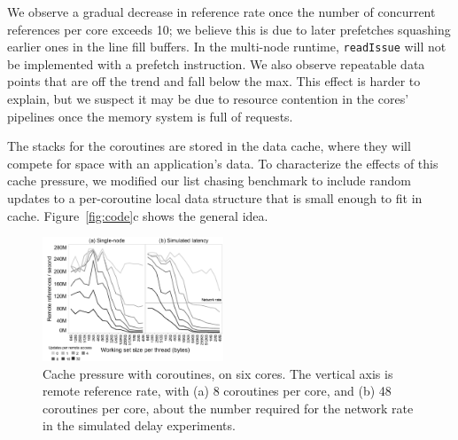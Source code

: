 \documentclass[10pt,nocopyrightspace]{sigplanconf}
\begin{document}
We observe a gradual decrease in reference rate once the number of
concurrent references per core exceeds 10; we believe this is due to
later prefetches squashing earlier ones in the line fill buffers. In
the multi-node runtime, \texttt{readIssue} will not be implemented
with a prefetch instruction. 
We also observe repeatable data points that are off the trend and fall below the max. This effect is harder to explain, but we suspect it may be
due to resource contention in the cores' pipelines once the memory
system is full of requests. 



The stacks for the coroutines are stored in the data cache, where they
will compete for space with an application's data. To characterize the
effects of this cache pressure, we modified our list chasing benchmark
to include random updates to a per-coroutine local data structure that
is small enough to fit in cache. Figure~\ref{fig:code}c shows the
general idea.

\begin{figure}[t]
  \begin{center}
    \includegraphics[width=0.48\textwidth]{figures/cachepressure-64to4M-edited2.pdf}
  \end{center}
  \caption{Cache pressure with coroutines, on six cores. The vertical
    axis is remote reference rate, with (a) 8 coroutines per core, and
    (b) 48 coroutines per core, about the number required for the
    network rate in the simulated delay experiments. }
  \vspace{-1.5pt} %
  \label{fig:cache-pressure}
\end{figure}
\end{document}
